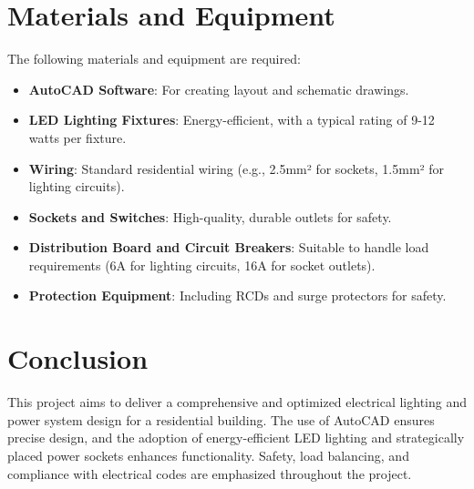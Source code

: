 \documentclass[a4paper,12pt]{article}
\begin{document}
\section{Materials and Equipment}
The following materials and equipment are required:
\begin{itemize}
    \item \textbf{AutoCAD Software}: For creating layout and schematic drawings.
    \item \textbf{LED Lighting Fixtures}: Energy-efficient, with a typical rating of 9-12 watts per fixture.
    \item \textbf{Wiring}: Standard residential wiring (e.g., 2.5mm² for sockets, 1.5mm² for lighting circuits).
    \item \textbf{Sockets and Switches}: High-quality, durable outlets for safety.
    \item \textbf{Distribution Board and Circuit Breakers}: Suitable to handle load requirements (6A for lighting circuits, 16A for socket outlets).
    \item \textbf{Protection Equipment}: Including RCDs and surge protectors for safety.
\end{itemize}

\section{Conclusion}
This project aims to deliver a comprehensive and optimized electrical lighting and power system design for a residential building. The use of AutoCAD ensures precise design, and the adoption of energy-efficient LED lighting and strategically placed power sockets enhances functionality. Safety, load balancing, and compliance with electrical codes are emphasized throughout the project.


\end{document}
